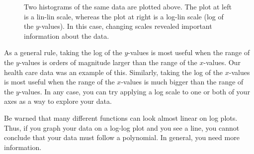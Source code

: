\begin{figure}
\begin{subfigure}{.5\textwidth}
\end{subfigure}
\caption{Two histograms of the same data are plotted above. 
The plot at left is a lin-lin scale, whereas the plot at right is a log-lin scale (log of the $y$-values). 
In this case, changing scales revealed important information about the data.}
\label{fig:healthcare}
\end{figure}

As a general rule, taking the log of the $y$-values is most useful when the range of the $y$-values is orders of magnitude larger than the range of the $x$-values. 
Our health care data was an example of this. 
Similarly, taking the log of the $x$-values is most useful when the range of the $x$-values is much bigger than the range of the $y$-values. 
In any case, you can try applying a log scale to one or both of your axes as a way to explore your data.

Be warned that many different functions can look almost linear on log plots. 
Thus, if you graph your data on a log-log plot and you see a line, you cannot conclude that your data must follow a polynomial. 
In general, you need more information.

